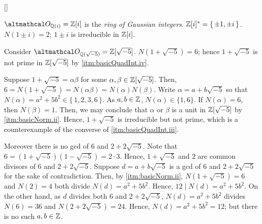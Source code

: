 \documentclass[../modern_algebra_2.tex]{subfiles}
\begin{document}
\begin{Example}{}[]
    \begin{enumerate}[label=(\roman*), ref=\protect{(\roman*)}, listparindent=\parindent]
        \ii 
        \(\rqi{i} = \ZZ{}[i]\) is the \emph{ring of Gaussian integers}.
        \(\ZZ{}[i]^\ast = \{\,\pm 1, \pm i\,\}\).
        \(N(1 \pm i) = 2\); \(1 \pm i\) is irreducible in \(\ZZ{}[i]\).

        \ii
        Consider \(\rqi{\sqrt{-5}} = \ZZ{}[\sqrt{-5}]\).
        \(N(1 + \sqrt{-5}) = 6\); hence \(1 + \sqrt{-5}\) is not prime in \(\ZZ{}[\sqrt{-5}]\)
        by \ref{itm:basicQuadInt.iv}.

        Suppose \(1 + \sqrt{-5} = \alpha \beta\) for some \(\alpha, \beta \in \ZZ{}[\sqrt{-5}]\).
        Then, \(6 = N(1 + \sqrt{-5}) = N(\alpha \beta) = N(\alpha) N(\beta)\).
        Write \(\alpha = a + b\sqrt{-5}\) so that
        \(N(\alpha) = a^2 + 5b^2 \in \{\,1,2,3,6\,\}\).
        As \(a, b \in \ZZ\), \(N(\alpha) \in \{1, 6\}\).
        If \(N(\alpha) = 6\), then \(N(\beta) = 1\).
        Then, we may conclude that \(\alpha\) or \(\beta\) is a unit in \(\ZZ{}[\sqrt{-5}]\)
        by \ref{itm:basicNorm.ii}.
        Hence, \(1+\sqrt{-5}\) is irreducible but not prime, which is a counterexample
        of the converse of \ref{itm:basicQuadInt.iii}.

        Moreover there is no gcd of \(6\) and \(2 + 2\sqrt{-5}\). Note that
        \(6 = (1 + \sqrt{-5})(1 - \sqrt{-5}) = 2 \cdot 3\). Hence, \(1+\sqrt{-5}\) and \(2\) are
        common divisors of \(6\) and \(2 + 2\sqrt{-5}\). Suppose \(d = a + b\sqrt{-5}\) is a gcd of
        \(6\) and \(2+2\sqrt{-5}\) for the sake of contradiction. Then, by \ref{itm:basicNorm.ii},
        \(N(1+\sqrt{-5}) = 6\) and \(N(2) = 4\) both divide \(N(d) = a^2 + 5b^2\).
        Hence, \(12 \mid N(d) = a^2 + 5b^2\).
        On the other hand, as \(d\) divides both \(6\) and \(2+2\sqrt{-5}\),
        \(N(d) = a^2 + 5b^2\) divides \(N(6) = 36\) and \(N(2+2\sqrt{-5}) = 24\).
        Hence, \(N(d) = a^2 + 5b^2 = 12\); but there is no such \(a, b \in \ZZ\).
    \end{enumerate}
\end{Example}
\end{document}
